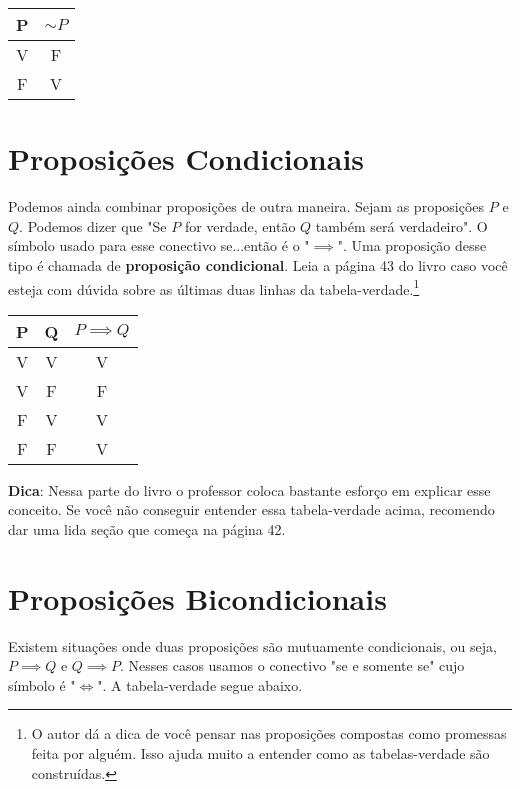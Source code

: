 \documentclass[a4paper,11pt]{book}
\theoremstyle{definition}
\theoremstyle{break}
\begin{document}
\begin{center}
\begin{tabular}{ | c || c | }
\hline
 P & $\sim P$ \\ 
 \hline
 V & F \\  
 F & V \\
 \hline
\end{tabular}
\end{center}

\section{Proposições Condicionais}

Podemos ainda combinar proposições de outra maneira. Sejam as proposições $P$ e $Q$. Podemos dizer que "Se $P$ for verdade, então $Q$ também será verdadeiro". O símbolo usado para esse conectivo se...então é o "$\implies$". Uma proposição desse tipo é chamada de \textbf{proposição condicional}. Leia a página 43 do livro caso você esteja com dúvida sobre as últimas duas linhas da tabela-verdade.\footnote{O autor dá a dica de você pensar nas proposições compostas como promessas feita por alguém. Isso ajuda muito a entender como as tabelas-verdade são construídas.}

\begin{center}
\begin{tabular}{ | c c || c | }
\hline
 P & Q & $P \implies Q$ \\ 
 \hline
 V & V & V \\  
 V & F & F \\  
 F & V & V \\  
 F & F & V \\
 \hline
\end{tabular}
\end{center}

\textbf{Dica}: Nessa parte do livro o professor coloca bastante esforço em explicar esse conceito. Se você não conseguir entender essa tabela-verdade acima, recomendo dar uma lida seção que começa na página 42.

\section{Proposições Bicondicionais}

Existem situações onde duas proposições são mutuamente condicionais, ou seja, $P \implies Q$ e $Q \implies P$. Nesses casos usamos o conectivo "se e somente se" cujo símbolo é "$\iff$".  A tabela-verdade segue abaixo.
\end{document}
